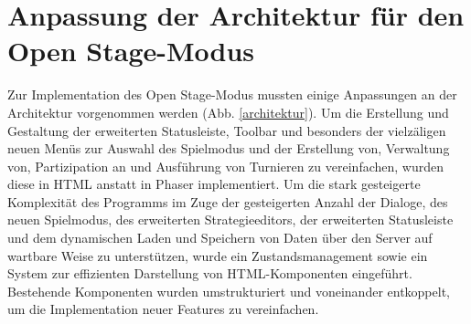\section{Anpassung der Architektur für den Open Stage-Modus}

Zur Implementation des Open Stage-Modus mussten einige Anpassungen an der Architektur vorgenommen
werden (Abb. \ref{architektur}). Um die Erstellung und Gestaltung der erweiterten Statusleiste,
Toolbar und besonders der vielzäligen neuen Menüs zur Auswahl des Spielmodus und der Erstellung von,
Verwaltung von, Partizipation an und Ausführung von Turnieren zu vereinfachen, wurden diese in HTML
anstatt in Phaser implementiert. Um die stark gesteigerte Komplexität des Programms im Zuge der
gesteigerten Anzahl der Dialoge, des neuen Spielmodus, des erweiterten Strategieeditors, der
erweiterten Statusleiste und dem dynamischen Laden und Speichern von Daten über den Server auf
wartbare Weise zu unterstützen, wurde ein Zustandsmanagement sowie ein System zur effizienten
Darstellung von HTML-Komponenten eingeführt. Bestehende Komponenten wurden umstrukturiert und
voneinander entkoppelt, um die Implementation neuer Features zu vereinfachen.

